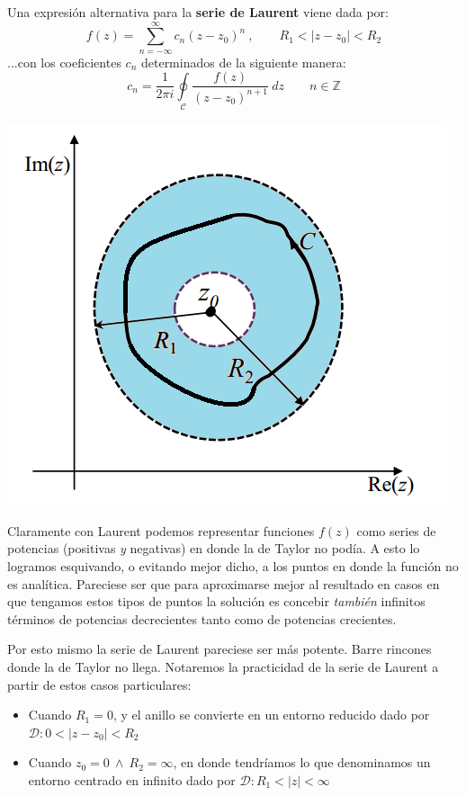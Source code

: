 \documentclass[12pt]{article}
\theoremstyle{definition}
\theoremstyle{theorem}
\theoremstyle{corolary}
\theoremstyle{method}
\begin{document}
Una expresi\'on alternativa para la \textbf{serie de Laurent} viene dada por:
$$f(z)=\sum\limits_{n=-\infty}^{\infty}c_n(z-z_0)^n\ ,\qquad R_1<|z-z_0|<R_2$$
...con los coeficientes $c_n$ determinados de la siguiente manera: $$c_n = \frac{1}{2\pi i}\oint\limits_{\mathcal{C}}\frac{f(z)}{(z-z_0)^{n+1}}\ dz \qquad n\in \mathbb{Z}$$

\begin{center}
	\includegraphics[scale=0.6]{anillo.png}
\end{center}

Claramente con Laurent podemos representar funciones $f(z)$ como series de potencias (positivas \textit{y} negativas) en donde la de Taylor no pod\'ia. A esto lo logramos esquivando, o evitando mejor dicho, a los puntos en donde la funci\'on no es anal\'itica. Pareciese ser que para aproximarse mejor al resultado en casos en que tengamos estos tipos de puntos la soluci\'on es concebir \textit{tambi\'en} infinitos t\'erminos de potencias decrecientes tanto como de potencias crecientes.

Por esto mismo la serie de Laurent pareciese ser m\'as potente. Barre rincones donde la de Taylor no llega. Notaremos la practicidad de la serie de Laurent a partir de estos casos particulares:
\begin{itemize}
	\item Cuando $R_1=0$, y el anillo se convierte en un entorno reducido dado por $\mathcal{D}: 0<|z-z_0|<R_2$
	\item Cuando $z_0=0\ \land\ R_2=\infty$, en donde tendr\'iamos lo que denominamos un entorno centrado en infinito dado por $\mathcal{D}:R_1<|z|<\infty$
\end{itemize}
\end{document}
